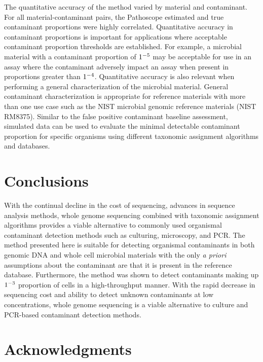 \documentclass[fleqn,10pt,lineno]{wlpeerj}\usepackage[]{graphicx}\usepackage[]{color}
\begin{document}
The quantitative accuracy of the method varied by material and contaminant. 
For all material-contaminant pairs, the Pathoscope estimated and true contaminant proportions were highly correlated. 
Quantitative accuracy in contaminant proportions is important for applications where acceptable contaminant proportion thresholds are established. 
For example, a microbial material with a contaminant proportion of $1 \time 10^{-5}$ may be acceptable for use in an assay where the contaminant adversely impact an assay when present in proportions greater than $1 \time 10^{-4}$. 
Quantitative accuracy is also relevant when performing a general characterization of the microbial material. 
General contaminant characterization is appropriate for reference materials with more than one use case such as the NIST microbial genomic reference materials (NIST RM8375)\citep{olson2016pepr}.  
Similar to the false positive contaminant baseline assessment, 
simulated data can be used to evaluate the minimal detectable contaminant proportion for specific organisms using different taxonomic assignment algorithms and databases. 

\section*{Conclusions}
With the continual decline in the cost of sequencing, advances in sequence analysis methods, whole genome sequencing combined with taxonomic assignment algorithms provides a viable alternative to commonly used organismal contaminant detection methods such as culturing, microscopy, and PCR. 
The method presented here is suitable for detecting organismal contaminants in both genomic DNA and whole cell microbial materials with the only \textit{a priori} assumptions about the contaminant are that it is present in the reference database. 
Furthermore, the method was shown to detect contaminants making up $1 \time 10^{-3}$ proportion of cells in a high-throughput manner. 
With the rapid decrease in sequencing cost and ability to detect unknown contaminants at low concentrations, whole genome sequencing is a viable alternative to culture and PCR-based contaminant detection methods. 

\newpage

\section*{Acknowledgments}
\end{document}
